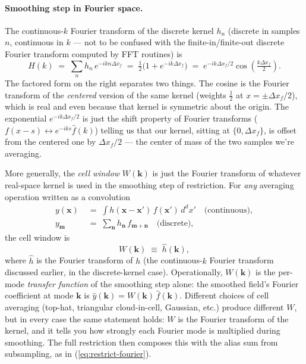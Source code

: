 \documentclass[12pt]{article}
\begin{document}
\paragraph{Smoothing step in Fourier space.}
The continuous-$k$ Fourier transform of the discrete kernel $h_n$
(discrete in samples $n$, continuous in $k$ --- not to be confused with
the finite-in/finite-out discrete Fourier transform computed by FFT
routines) is
\begin{equation}
  H(k)\;=\;\sum_n h_n\,e^{-i k n \Delta x_f}
       \;=\;\tfrac12\bigl(1 + e^{-ik\Delta x_f}\bigr)
       \;=\;e^{-ik\Delta x_f/2}\cos\!\left(\tfrac{k\Delta x_f}{2}\right).
\end{equation}
The factored form on the right separates two things. The cosine is the
Fourier transform of the \emph{centered} version of the same kernel
(weights $\tfrac12$ at $x=\pm\Delta x_f/2$), which is real and even
because that kernel is symmetric about the origin. The exponential
$e^{-ik\Delta x_f/2}$ is just the shift property of Fourier transforms
($f(x-s)\leftrightarrow e^{-iks}\hat f(k)$) telling us that our kernel,
sitting at $\{0,\Delta x_f\}$, is offset from the centered one by
$\Delta x_f/2$ --- the center of mass of the two samples we're
averaging.

More generally, the \emph{cell window} $W(\mathbf k)$ is just the
Fourier transform of whatever real-space kernel is used in the
smoothing step of restriction. For \emph{any} averaging operation
written as a convolution
\begin{align}
  y(\mathbf x) &\;=\; \int h(\mathbf x - \mathbf x')\,f(\mathbf x')\,d^d x'
                 \quad\text{(continuous)},\\
  y_{\mathbf m} &\;=\; \sum_{\mathbf n} h_{\mathbf n}\,f_{\mathbf m + \mathbf n}
                 \quad\text{(discrete)},
\end{align}
the cell window is
\begin{equation}
  W(\mathbf k) \;\equiv\; \hat h(\mathbf k),
\end{equation}
where $\hat h$ is the Fourier transform of $h$ (the continuous-$k$
Fourier transform discussed earlier, in the discrete-kernel case). Operationally, $W(\mathbf k)$ is the per-mode
\emph{transfer function} of the smoothing step alone: the smoothed
field's Fourier coefficient at mode $\mathbf k$ is
$\hat y(\mathbf k) = W(\mathbf k)\,\hat f(\mathbf k)$. Different choices
of cell averaging (top-hat, triangular cloud-in-cell, Gaussian, etc.)
produce different $W$, but in every case the same statement holds: $W$
is the Fourier transform of the kernel, and it tells you how strongly
each Fourier mode is multiplied during smoothing. The full restriction
then composes this with the alias sum from subsampling, as in
(\ref{eq:restrict-fourier}).
\end{document}
